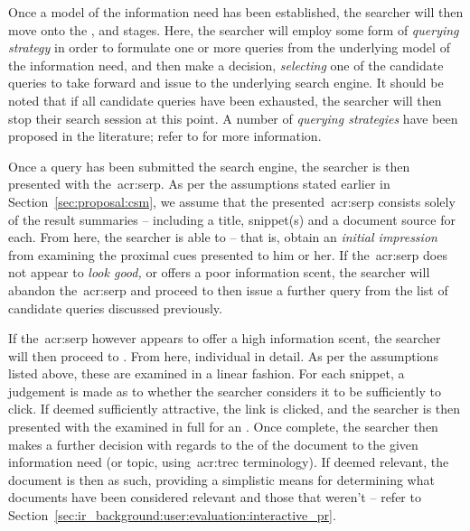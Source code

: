 Once a model of the information need has been established, the searcher will then move onto the ,  and  stages. Here, the searcher will employ some form of \emph{querying strategy} in order to formulate one or more queries from the underlying model of the information need, and then make a decision, \emph{selecting} one of the candidate queries to take forward and issue to the underlying search engine. It should be noted that if all candidate queries have been exhausted, the searcher will then stop their search session at this point. A number of \emph{querying strategies} have been proposed in the literature; refer to  for more information.

Once a query has been submitted the search engine, the searcher is then presented with the~\gls{acr:serp}. As per the assumptions stated earlier in Section~\ref{sec:proposal:csm}, we assume that the presented~\gls{acr:serp} consists solely of the result summaries -- including a title, snippet(s) and a document source for each. From here, the searcher is able to  -- that is, obtain an \emph{initial impression} from examining the proximal cues presented to him or her. If the~\gls{acr:serp} does not appear to \emph{look good,} or offers a poor information scent, the searcher will abandon the~\gls{acr:serp} and proceed to then issue a further query from the list of candidate queries discussed previously.

If the~\gls{acr:serp} however appears to offer a high information scent, the searcher will then proceed to . From here, individual  in detail. As per the assumptions listed above, these are examined in a linear fashion. For each snippet, a judgement is made as to whether the searcher considers it to be sufficiently  to click. If deemed sufficiently attractive, the link is clicked, and the searcher is then presented with the  examined in full for an . Once complete, the searcher then makes a further decision with regards to the  of the document to the given information need (or topic, using~\gls{acr:trec} terminology). If deemed relevant, the document is then  as such, providing a simplistic means for determining what documents have been considered relevant and those that weren't -- refer to Section~\ref{sec:ir_background:user:evaluation:interactive_pr}.

